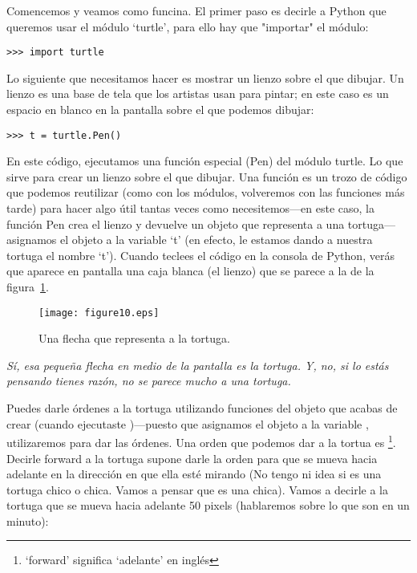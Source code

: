 Comencemos y veamos como funcina.  El primer paso es decirle a Python que queremos usar el módulo `turtle', para ello hay que "importar" el módulo:

\begin{listing}
\begin{verbatim}
>>> import turtle
\end{verbatim}
\end{listing}

Lo siguiente que necesitamos hacer es mostrar un lienzo sobre el que dibujar.  Un lienzo es una base de tela que los artistas usan para pintar; en este caso es un espacio en blanco en la pantalla sobre el que podemos dibujar:

\begin{listing}
\begin{verbatim}
>>> t = turtle.Pen()
\end{verbatim}
\end{listing}

En este código, ejecutamos una función especial (Pen) del módulo turtle. Lo que sirve para crear un lienzo sobre el que dibujar. Una función es un trozo de código que podemos reutilizar (como con los módulos, volveremos con las funciones más tarde) para hacer algo útil tantas veces como necesitemos---en este caso, la función Pen crea el lienzo y devuelve un objeto que representa a una tortuga---asignamos el objeto a la variable `t' (en efecto, le estamos dando a nuestra tortuga el nombre `t'). Cuando teclees el código en la consola de Python, verás que aparece en pantalla una caja blanca (el lienzo) que se parece a la de la figura~\ref{fig10}.

\begin{figure}
\begin{center}
\texttt{[image: figure10.eps]}
\end{center}
\caption{Una flecha que representa a la tortuga.}\label{fig10}
\end{figure}

\emph{Sí, esa pequeña flecha en medio de la pantalla es la tortuga. Y, no, si lo estás pensando tienes razón, no se parece mucho a una tortuga.}

Puedes darle órdenes a la tortuga utilizando funciones del objeto que acabas de crear (cuando ejecutaste )---puesto que asignamos el objeto a la variable , utilizaremos  para dar las órdenes.
Una orden que podemos dar a la tortua es \footnote{`forward' significa `adelante' en inglés}.  Decirle forward a la tortuga supone darle la orden para que se mueva hacia adelante en la dirección en que ella esté mirando (No tengo ni idea si es una tortuga chico o chica. Vamos a pensar que es una chica). Vamos a decirle a la tortuga que se mueva hacia adelante 50 pixels (hablaremos sobre lo que son en un minuto):

